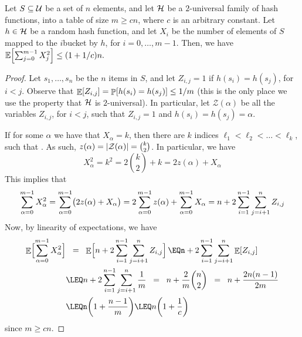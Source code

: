 \begin{lemma}
    Let $S \subseteq \mathcal{U}$ be a set of $n$ elements, and let $\mathcal{H}$ be a
    $2$-universal family of hash functions, into a table of size
    $m \geq cn$, where $c$ is an arbitrary constant. Let $h \in \mathcal{H}$
    be a random hash function, and let $X_i$ be the number of elements
    of $S$ mapped to the $i$\th bucket by $h$, for $i=0,\ldots, m-1$.
    Then, we have
    \begin{math}
        \mathbb{E} \Bigl[\sum_{j=0}^{m-1} X_j^2 \Bigr] \leq (1+1/c)n.
    \end{math}
\end{lemma}
\begin{proof}
    Let $s_1, \ldots, s_n$ be the $n$ items in $S$, and let
    $Z_{i,j} =1$ if $h(s_i) = h(s_j)$, for $i < j$.  Observe that
    $\Ex{Z_{i,j} } = \Prob{h(s_i) = h(s_j)} \leq 1/m$ (this is the
    only place we use the property that $\mathcal{H}$ is $2$-universal).  In
    particular, let $\mathcal{Z}(\alpha)$ be all the variables
    $Z_{i,j}$, for $i<j$, such that $Z_{i,j}=1$ and
    $h(s_i) = h(s_j) = \alpha$.
    
    If for some $\alpha$ we have that $X_\alpha = k$, then there are
    $k$ indices $\ell_1 < \ell_2 < \ldots < \ell_k$, such that
    . As such,
    $z(\alpha)=\left| {\mathcal{Z}(\alpha)} \right| = \binom{k}{2}$. In
    particular, we have
    \begin{equation*}
        X_\alpha^2%
        =%
        k^2 %
        =%
        2 \binom{k}{2}  + k%
        =%
        2 z(\alpha) + X_\alpha
    \end{equation*}
    This implies that
    \begin{equation*}
        \sum_{\alpha=0}^{m-1} X_\alpha^2%
        =%
        \sum_{\alpha=0}^{m-1} \pth{\bigl.2 z(\alpha) + X_\alpha}
        =%
        2 \sum_{\alpha=0}^{m-1}  z(\alpha) + \sum_{\alpha=0}^{m-1}  X_\alpha
        =%
        n +  2 \sum_{i=1}^{n-1} 
        \sum_{j=i+1}^n Z_{i,j}%
    \end{equation*}
    Now, by linearity of expectations, we have
    \begin{align*}
        \Ex{\smash{\sum_{\alpha=0}^{m-1} X_\alpha^2}\Bigr.}%
        &\EQ%
        \Ex{n +  \smash{2 \sum_{i=1}^{n-1} 
              \sum_{j=i+1}^n Z_{i,j} } \Bigr.}%
        \EQ%
        n +  2 \sum_{i=1}^{n-1} 
        \sum_{j=i+1}^n\Ex{ Z_{i,j} } %
        \\&
        \LEQ %
        n +  2 \sum_{i=1}^{n-1} \sum_{j=i+1}^n\frac{1}{m} %
        \EQ %
        n +  \frac{2}{m} \binom{n}{2}%
        \EQ %
        n  +  \frac{2n(n-1)}{2m}
        \\&
        \LEQ%
        n \pth{1 +  \frac{n-1}{m}}
        \LEQ
        n\pth{1  + \frac{1}{c}}
    \end{align*}
    since $m \geq c n$.
\end{proof}


